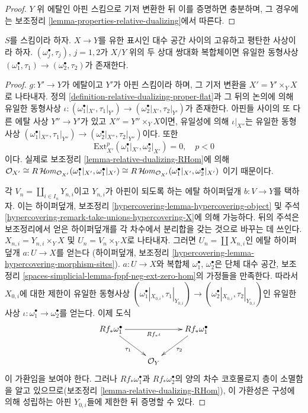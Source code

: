 \begin{proof}
$Y$ 위 에탈인 아핀 스킴으로 기저 변환한 뒤 이를 증명하면 충분하며,
그 경우에는 보조정리 \ref{lemma-properties-relative-dualizing}에서
따른다.
\end{proof}

\begin{lemma}
\label{lemma-uniqueness-relative-dualizing}
$S$를 스킴이라 하자. $X \to Y$를 유한 표시인 대수 공간 사이의
고유하고 평탄한 사상이라 하자. $(\omega_j^\bullet, \tau_j)$,
$j = 1, 2$가 $X/Y$ 위의 두 상대 쌍대화 복합체이면 유일한 동형사상
$(\omega_1^\bullet, \tau_1) \to (\omega_2^\bullet, \tau_2)$가 존재한다.
\end{lemma}

\begin{proof}
$g : Y' \to Y$가 에탈이고 $Y'$가 아핀 스킴이라 하며, 그 기저 변환을
$X' = Y' \times_Y X$로 나타내자. 정의
\ref{definition-relative-dualizing-proper-flat}과 그 뒤의 논의에 의해
유일한 동형사상
$\iota : (\omega_1^\bullet|_{X'}, \tau_1|_{Y'}) \to
(\omega_2^\bullet|_{X'}, \tau_2|_{Y'})$가 존재한다. 아핀들 사이의
또 다른 에탈 사상 $Y'' \to Y'$가 있고
$X'' = Y'' \times_Y X$이면, 유일성에 의해 $\iota|_{X''}$는 유일한
동형사상
$(\omega_1^\bullet|_{X''}, \tau_1|_{Y''}) \to
(\omega_2^\bullet|_{X''}, \tau_2|_{Y''})$이다. 또한
$$
\text{Ext}^p_{X'}(\omega_1^\bullet|_{X'}, \omega_2^\bullet|_{X'}) = 0,
\quad p < 0
$$
이다. 실제로 보조정리 \ref{lemma-relative-dualizing-RHom}에 의해
$
\mathcal{O}_{X'} \cong
R\mathop{\mathcal{H}\!\mathit{om}}\nolimits_{\mathcal{O}_{X'}}(\omega_1^\bullet|_{X'}, \omega_1^\bullet|_{X'})
\cong
R\mathop{\mathcal{H}\!\mathit{om}}\nolimits_{\mathcal{O}_{X'}}(\omega_1^\bullet|_{X'}, \omega_2^\bullet|_{X'})
$
이기 때문이다.

\medskip\noindent
각 $V_n = \coprod_{i \in I_n} Y_{n, i}$이고 $Y_{n, i}$가 아핀이 되도록
하는 에탈 하이퍼덮개 $b : V \to Y$를 택하자. 이는 하이퍼덮개,
보조정리 \ref{hypercovering-lemma-hypercovering-object} 및 주석
\ref{hypercovering-remark-take-unions-hypercovering-X}에 의해 가능하다.
뒤의 주석은 보조정리에서 얻은 하이퍼덮개를 각 차수에서 분리합을 갖는
것으로 바꾸는 데 쓰인다. $X_{n, i} = Y_{n, i} \times_Y X$ 및
$U_n = V_n \times_Y X$로 나타내자. 그러면
$U_n = \coprod X_{n, i}$인 에탈 하이퍼덮개 $a : U \to X$를 얻는다
(하이퍼덮개, 보조정리
\ref{hypercovering-lemma-hypercovering-morphism-sites}).
$a : U \to X$와 복합체 $\omega_1^\bullet$, $\omega_2^\bullet$은
단체 대수 공간, 보조정리
\ref{spaces-simplicial-lemma-fppf-neg-ext-zero-hom}의 가정들을 만족한다.
따라서 $X_{0, i}$에 대한 제한이 유일한 동형사상
$(\omega_1^\bullet|_{X_{0, i}}, \tau_1|_{Y_{0, i}}) \to
(\omega_2^\bullet|_{X_{0, i}}, \tau_2|_{Y_{0, i}})$인 유일한 사상
$\iota : \omega_1^\bullet \to \omega_2^\bullet$를 얻는다.
이제 도식
$$
\xymatrix{
Rf_*\omega_1^\bullet \ar[rd]_{\tau_1} \ar[rr]_{Rf_*\iota} & &
Rf_*\omega_1^\bullet \ar[ld]^{\tau_2} \\
& \mathcal{O}_Y
}
$$
이 가환임을 보여야 한다. 그러나
$Rf_*\omega_1^\bullet$과 $Rf_*\omega_2^\bullet$의 양의 차수
코호몰로지 층이 소멸함을 알고 있으므로(보조정리
\ref{lemma-relative-dualizing-RHom}), 이 가환성은 구성에 의해 성립하는
아핀 $Y_{0, i}$들에 제한한 뒤 증명할 수 있다.
\end{proof}

